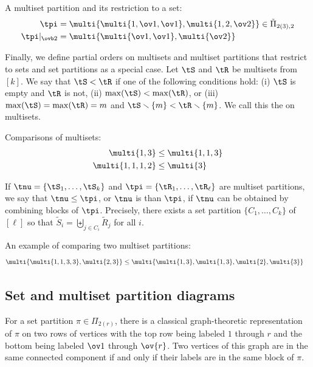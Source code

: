 \begin{exam} A multiset partition and its restriction to a set:
    \begin{align*}
        \tpi&=\multi{\multi{1,\ov1,\ov1},\multi{1,2,\ov2}}\in\tilde\Pi_{2(3),2}\\
        \tpi|_{\ovb2}&=\multi{\multi{\ov1,\ov1},\multi{\ov2}}
    \end{align*}
\end{exam}

Finally, we define partial orders on multisets and multiset partitions that restrict to sets and set partitions as a special case. Let $\tS$ and $\tR$ be multisets from $[k]$. We say that $\tS<\tR$ if one of the following conditions hold: (i) $\tS$ is empty and $\tR$ is not, (ii) $\max(\tS)<\max(\tR)$, or (iii) $\max(\tS)=\max(\tR)=m$ and $\tS\smallsetminus\{m\}<\tR\smallsetminus\{m\}$. We call this the  on multisets.

\begin{exam} Comparisons of multisets:
    \begin{align*}
        \multi{1,3}&\leq\multi{1,1,3}\\
        \multi{1,1,1,2}&\leq\multi{3}
    \end{align*}
\end{exam}

If $\tnu=\{\tS_1,\dots,\tS_k\}$ and $\tpi=\{\tR_1,\dots,\tR_\ell\}$ are multiset partitions, we say that $\tnu\leq\tpi$, or $\tnu$ is  than $\tpi$, if $\tnu$ can be obtained by combining blocks of $\tpi$. Precisely, there exists a set partition $\{C_1,\dots,C_k\}$ of $[\ell]$ so that $\tilde{S}_i=\biguplus_{j\in C_i}\tilde{R}_j$ for all $i$.

\begin{exam} An example of comparing two multiset partitions:
    \begin{align*}
        \multi{\multi{1,1,3,3},\multi{2,3}}&\leq\multi{\multi{1,3},\multi{1,3},\multi{2},\multi{3}}
    \end{align*}
\end{exam}

\subsection[Diagrams]{Set and multiset partition diagrams}

For a set partition $\pi\in\Pi_{2(r)}$, there is a classical graph-theoretic representation of $\pi$ on two rows of vertices with the top row being labeled $1$ through $r$ and the bottom being labeled $\ov1$ through $\ov{r}$. Two vertices of this graph are in the same connected component if and only if their labels are in the same block of $\pi$. 

